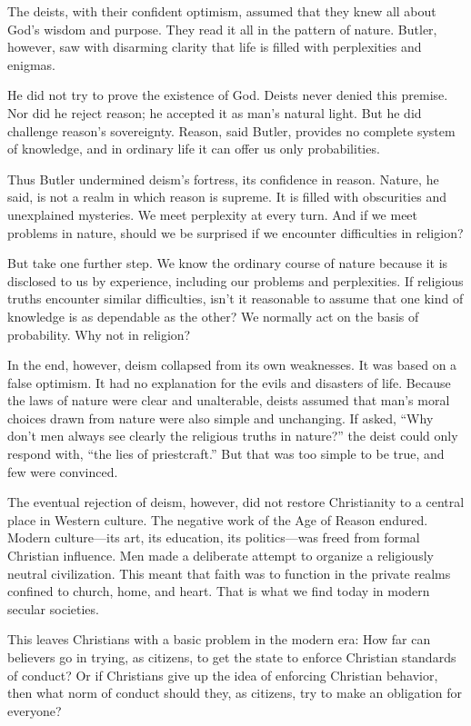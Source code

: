 The deists, with their confident optimism, assumed that they knew all about God’s wisdom and
purpose. They read it all in the pattern of nature. Butler, however, saw with disarming clarity that
life is filled with perplexities and enigmas.

He did not try to prove the existence of God. Deists never denied this premise. Nor did he reject
reason; he accepted it as man’s natural light. But he did challenge reason’s sovereignty. Reason,
said Butler, provides no complete system of knowledge, and in ordinary life it can offer us only
probabilities.

Thus Butler undermined deism’s fortress, its confidence in reason. Nature, he said, is not a realm
in which reason is supreme. It is filled with obscurities and unexplained mysteries. We meet
perplexity at every turn. And if we meet problems in nature, should we be surprised if we encounter
difficulties in religion?

But take one further step. We know the ordinary course of nature because it is disclosed to us by
experience, including our problems and perplexities. If religious truths encounter similar
difficulties, isn’t it reasonable to assume that one kind of knowledge is as dependable as the
other? We normally act on the basis of probability. Why not in religion?

In the end, however, deism collapsed from its own weaknesses. It was based on a false optimism. It
had no explanation for the evils and disasters of life. Because the laws of nature were clear and
unalterable, deists assumed that man’s moral choices drawn from nature were also simple and
unchanging. If asked, “Why don’t men always see clearly the religious truths in nature?” the deist
could only respond with, “the lies of priestcraft.” But that was too simple to be true, and few were
convinced.

The eventual rejection of deism, however, did not restore Christianity to a central place in Western
culture. The negative work of the Age of Reason endured. Modern culture—its art, its education, its
politics—was freed from formal Christian influence. Men made a deliberate attempt to organize a
religiously neutral civilization. This meant that faith was to function in the private realms
confined to church, home, and heart. That is what we find today in modern secular societies.

This leaves Christians with a basic problem in the modern era: How far can believers go in trying,
as citizens, to get the state to enforce Christian standards of conduct? Or if Christians give up
the idea of enforcing Christian behavior, then what norm of conduct should they, as citizens, try to
make an obligation for everyone?

